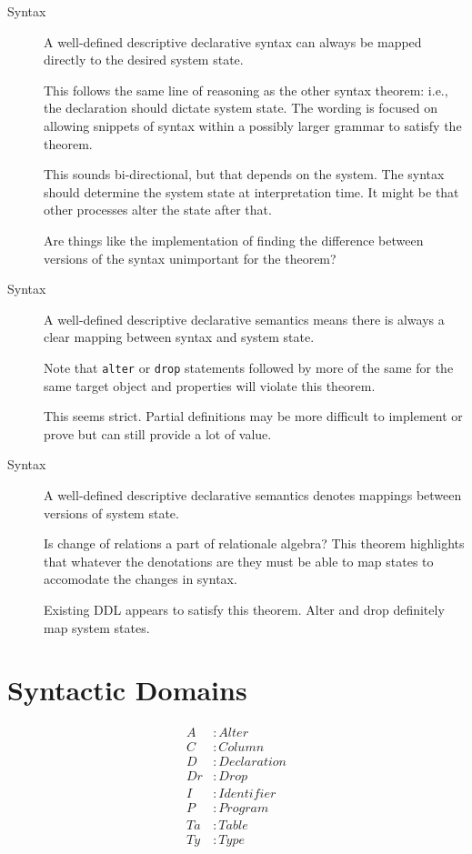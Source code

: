 \documentclass[12pt]{article}
\begin{document}
\begin{description}
  \item[Syntax] A well-defined descriptive declarative syntax can always be mapped directly to the desired system state.

    This follows the same line of reasoning as the other syntax theorem: i.e., the declaration should dictate system state. The wording is focused on allowing snippets of syntax within a possibly larger grammar to satisfy the theorem.

    This sounds bi-directional, but that depends on the system. The syntax should determine the system state at interpretation time. It might be that other processes alter the state after that.

    Are things like the implementation of finding the difference between versions of the syntax unimportant for the theorem?

    \vspace{0.5cm}

  \item[Syntax] A well-defined descriptive declarative semantics means there is always a clear mapping between syntax and system state.

    Note that \verb|alter| or \verb|drop| statements followed by more of the same for the same target object and properties will violate this theorem.

    This seems strict. Partial definitions may be more difficult to implement or prove but can still provide a lot of value.

    \vspace{0.5cm}

  \item[Syntax] A well-defined descriptive declarative semantics denotes mappings between versions of system state.

    Is change of relations a part of relationale algebra? This theorem highlights that whatever the denotations are they must be able to map states to accomodate the changes in syntax.

    Existing DDL appears to satisfy this theorem. Alter and drop definitely map system states.
\end{description}

\section{Syntactic Domains}
\begin{align*}
  A &: Alter \\
  C &: Column \\
  D &: Declaration \\
  Dr &: Drop \\
  I &: Identifier \\
  P &: Program \\
  Ta &: Table \\
  Ty &: Type
\end{align*}
\end{document}
